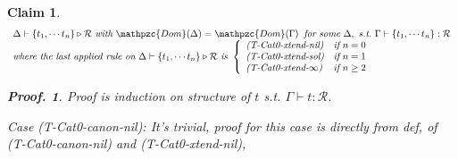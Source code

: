 \documentclass[12pt]{article}
\newtheorem{Claim}{Claim}[section]
\newtheorem{Proof}{Proof.}
\begin{document}
\begin{Claim}
  \label{claim_for_soundness_on_extended_matching_2}
  \[ \begin{array}{l}
       \Delta \vdash \{t_1, \cdots t_n\} \triangleright \mathcal{R}\
        \text{\it with}\ \mathpzc{Dom}(\Delta) = \mathpzc{Dom}(\Gamma)\;\;
         \text{\it for some}\ \Delta,\ \text{\it s.t.}\
         \Gamma \vdash \{t_1, \cdots t_n\}  : \mathcal{R}  \\
       
       \text{\it where the last applied rule on}\
        \Delta \vdash \{t_1, \cdots t_n\} \triangleright
         \mathcal{R}\ \mathcal{\it is}\
       \left\{\begin{array}[c]{ll}
         \text{\it (T-Cat0-xtend-nil)}  &  \text{\it if}\ n = 0  \\
         \text{\it (T-Cat0-xtend-sol)}  &  \text{\it if}\ n = 1  \\
         \text{\it (T-Cat0-xtend-$\infty$)}  &  \text{\it if}\ n \ge 2
       \end{array}\right.
     \end{array}
  \]
  \begin{Proof}
    Proof is induction on structure of $t$ s.t.
    $\Gamma \vdash t : \mathcal{R}$.
    
    Case (T-Cat0-canon-nil): It's trivial, proof for this case is directly
    from def, of (T-Cat0-canon-nil) and (T-Cat0-xtend-nil),
        

\end{Proof}
\end{Claim}
\end{document}

